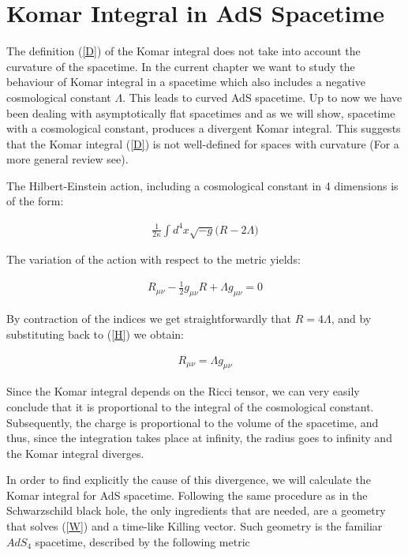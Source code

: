 \documentclass[a4paper,notitlepage]{report}
\begin{document}
\section{Komar Integral in AdS Spacetime}

The definition (\ref{D}) of the Komar integral does not take into account the curvature of the spacetime. In the current chapter we want to study the behaviour of Komar integral in a spacetime which also includes a negative cosmological constant $\Lambda$. This leads to curved AdS spacetime. Up to now we have been dealing with asymptotically flat spacetimes and as we will show, spacetime with a cosmological constant, produces a divergent Komar integral. This suggests that the Komar integral (\ref{D}) is not well-defined for spaces with curvature (For a more general review see\cite{bazanski1990gauss,kastor2008komar,kastor2009enthalpy}).

The Hilbert-Einstein action, including a cosmological constant in 4 dimensions is of the form:

\begin{align} \label{I}
\frac{1}{2\kappa} \int d^4x \sqrt{-g} \Big( R - 2\Lambda \Big)
\end{align}

\vspace{0.5 em}
The variation of the action with respect to the metric yields:

\begin{align}\label{H}
R_{\mu\nu} - \frac{1}{2} g_{\mu\nu} R + \Lambda g_{\mu\nu} = 0
\end{align}

\vspace{0.5 em}
By contraction of the indices we get straightforwardly that $R=4\Lambda$, and by substituting back to (\ref{H}) we obtain:

\begin{align} \label{W}
R_{\mu\nu} = \Lambda g_{\mu\nu}
\end{align}

\vspace{0.5 em}
Since the Komar integral depends on the Ricci tensor, we can very easily conclude that it is proportional to the integral of the cosmological constant. Subsequently, the charge is proportional to the volume of the spacetime, and thus, since the integration takes place at infinity, the radius goes to infinity and the Komar integral diverges.

In order to find explicitly the cause of this divergence, we will calculate the Komar integral for AdS spacetime. Following the same procedure as in the Schwarzschild black hole, the only ingredients that are needed, are a geometry that solves (\ref{W}) and a time-like Killing vector. Such geometry is the familiar $AdS_4$ spacetime, described by the following metric
\end{document}
